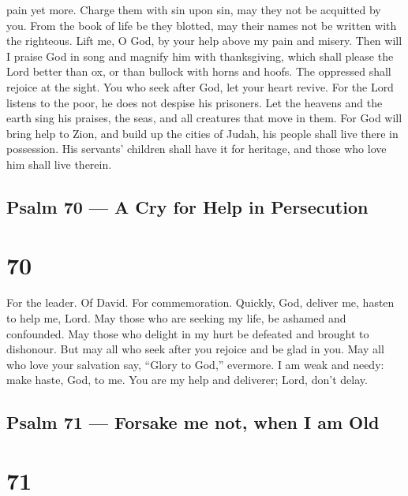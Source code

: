 pain yet more.  Charge them with sin upon sin, may they not
be acquitted by you.  From the book of life be they
blotted, may their names not be written with the righteous.
 Lift me, O God, by your help above my pain and misery.
 Then will I praise God in song and magnify him with
thanksgiving,  which shall please the Lord better than ox,
or than bullock with horns and hoofs.  The oppressed shall
rejoice at the sight. You who seek after God, let your heart revive.
 For the Lord listens to the poor, he does not despise his
prisoners.  Let the heavens and the earth sing his praises,
the seas, and all creatures that move in them.  For God
will bring help to Zion, and build up the cities of Judah, his people
shall live there in possession.  His servants' children
shall have it for heritage, and those who love him shall live therein.

\hypertarget{psalm-70-a-cry-for-help-in-persecution}{%
\subsection{Psalm 70 --- A Cry for Help in
Persecution}\label{psalm-70-a-cry-for-help-in-persecution}}

\hypertarget{section-69}{%
\section{70}\label{section-69}}

For the leader. Of David. For commemoration.  Quickly, God,
deliver me, hasten to help me, Lord.  May those who are
seeking my life, be ashamed and confounded.  May those who
delight in my hurt be defeated and brought to dishonour. 
But may all who seek after you rejoice and be glad in you. May all who
love your salvation say, ``Glory to God,'' evermore.  I am
weak and needy: make haste, God, to me. You are my help and deliverer;
Lord, don't delay.

\hypertarget{psalm-71-forsake-me-not-when-i-am-old}{%
\subsection{Psalm 71 --- Forsake me not, when I am
Old}\label{psalm-71-forsake-me-not-when-i-am-old}}

\hypertarget{section-70}{%
\section{71}\label{section-70}}

